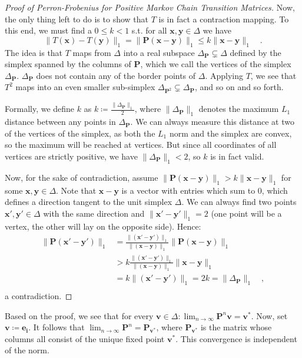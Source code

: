 \documentclass[../../main.tex]{subfiles}
\begin{document}
\begin{proof}[Proof of Perron-Frobenius for Positive Markov Chain Transition Matrices]
    \smallskip
    Now, the only thing left to do is to show that $T$ is in fact a contraction mapping. To this end, we must find a $0 \leq k < 1$ s.t. for all $\bm{x}, \bm{y} \in \Delta$ we have
    \[
        \|T(\bm{x}) - T(\bm{y})\|_1 = \|\bm{P} (\bm{x} - \bm{y})\|_1 \leq k \|\bm{x} - \bm{y}\|_1 \quad .
    \]
    The idea is that $T$ maps from $\Delta$ into a real subspace $\Delta_{\bm{P}} \subsetneq \Delta$ defined by the simplex spanned by the columns of $\bm{P}$, which we call the vertices of the simplex $\Delta_{\bm{P}}$. $\Delta_{\bm{P}}$ does not contain any of the border points of $\Delta$. Applying $T$, we see that $T^2$ maps into an even smaller sub-simplex $\Delta_{\bm{P}^2} \subsetneq \Delta_{\bm{P}}$, and so on and so forth.

    Formally, we define $k$ as $k \coloneqq \frac{\|\Delta_{\bm{P}}\|_1}{2}$, where $\|\Delta_{\bm{P}}\|_1$ denotes the maximum $L_1$ distance between any points in $\Delta_{\bm{P}}$. We can always measure this distance at two of the vertices of the simplex, as both the $L_1$ norm and the simplex are convex, so the maximum will be reached at vertices. But since all coordinates of all vertices are strictly positive, we have $\|\Delta_{\bm{P}}\|_1 < 2$, so $k$ is in fact valid.

    Now, for the sake of contradiction, assume $\|\bm{P} (\bm{x} - \bm{y})\|_1 > k \|\bm{x} - \bm{y}\|_1$ for some $\bm{x}, \bm{y} \in \Delta$. Note that $\bm{x} - \bm{y}$ is a vector with entries which sum to $0$, which defines a direction tangent to the unit simplex $\Delta$. We can always find two points $\bm{x}', \bm{y}' \in \Delta$ with the same direction and $\|\bm{x}' - \bm{y}'\|_1 = 2$ (one point will be a vertex, the other will lay on the opposite side). Hence:
    \begin{align*}
        \|\bm{P} (\bm{x}' - \bm{y}')\|_1 &= \frac{\|(\bm{x}' - \bm{y}')\|_1}{\|(\bm{x} - \bm{y})\|_1} \|\bm{P} (\bm{x} - \bm{y})\|_1 \\
        &> k \frac{\|(\bm{x}' - \bm{y}')\|_1}{\|(\bm{x} - \bm{y})\|_1} \|\bm{x} - \bm{y}\|_1 \\
        &= k \|(\bm{x}' - \bm{y}')\|_1 = 2k = \|\Delta_{\bm{P}}\|_1 \quad , \\
    \end{align*}
    a contradiction.
\end{proof}

\begin{corollary}
    Based on the proof, we see that for every $\bm{v} \in \Delta: \lim_{n \to \infty} \bm{P}^n \bm{v} = \bm{v}^*$. Now, set $\bm{v} \coloneqq \bm{e_i}$. It follows that $\lim_{n \to \infty} \bm{P}^n = \bm{P}_{\bm{v}^*}$, where $\bm{P}_{\bm{v}^*}$ is the matrix whose columns all consist of the unique fixed point $\bm{v}^*$. This convergence is independent of the norm.
\end{corollary}
\end{document}
